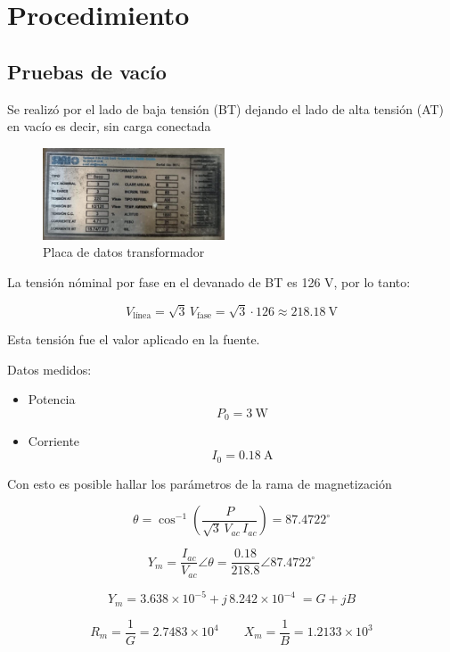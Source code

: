 \section{Procedimiento}

\subsection{Pruebas de vacío}
Se realizó por el lado de baja tensión (BT) dejando el lado de alta tensión (AT) en vacío es decir, sin carga conectada

\begin{figure}[h!] %
    \centering
    \includegraphics[width=0.48\textwidth]{figs/placa_datos.jpeg} %
    \caption{Placa de datos transformador}
    \label{fig:mi_imagen}
\end{figure}

La tensión nóminal por fase en el devanado de BT es 126 V, por lo tanto: 

\[
V_{\text{línea}} = \sqrt{3}\,V_{\text{fase}} = \sqrt{3}\cdot 126 \approx 218.18\ \mathrm{V}
\]

Esta tensión fue el valor aplicado en la fuente.


Datos medidos:

\begin{itemize}
    \item Potencia
\[
P_0 = 3 \ \text{W}
\]
\item Corriente
\[
I_0 = 0.18 \ \text{A}
\]
\end{itemize}

Con esto es posible hallar los parámetros de la rama de magnetización

\[
\theta = \cos^{-1}\!\left(\frac{P}{\sqrt{3} \, V_{ac} \, I_{ac}}\right) = 87.4722^\circ
\]

\[
Y_m = \frac{I_{ac}}{V_{ac}} \angle \theta = \frac{0.18}{218.8} \angle 87.4722^\circ
\]

\[
Y_m = 3.638 \times 10^{-5} + j\,8.242 \times 10^{-4} \; = G + jB
\]


\[
R_m = \frac{1}{G} = 2.7483 \times 10^{4}
\qquad
X_m = \frac{1}{B} = 1.2133 \times 10^{3}
\]






